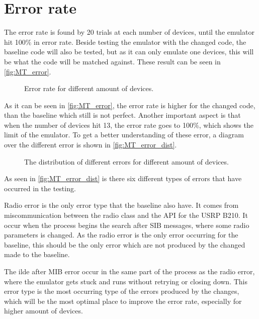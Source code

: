 \section{Error rate}
The error rate is found by 20 trials at each number of devices, until the emulator hit 100\% in error rate. Beside testing the emulator with the changed code, the baseline code will also be tested, but as it can only emulate one devices, this will be what the code will be matched against. These result can be seen in \autoref{fig:MT_error}.

\begin{figure}[H]
\centering
\resizebox{0.5\textwidth}{!}{
}
\caption{Error rate for different amount of devices.}
\label{fig:MT_error}
\end{figure}

As it can be seen in \autoref{fig:MT_error}, the error rate is higher for the changed code, than the baseline which still is not perfect. Another important aspect is that when the number of devices hit 13, the error rate goes to 100\%, which shows the limit of the emulator. To get a better understanding of these error, a diagram over the different error is shown in \autoref{fig:MT_error_dist}.

\begin{figure}[H]
\centering
\resizebox{0.8\textwidth}{!}{
}
\caption{The distribution of different errors for different amount of devices.}
\label{fig:MT_error_dist}
\end{figure}

As seen in \autoref{fig:MT_error_dist} is there six different types of errors that have occurred in the testing.

Radio error is the only error type that the baseline also have. It comes from miscommunication between the radio class and the API for the USRP B210. It occur when the process begins the search after SIB messages, where some radio parameters is changed. As the radio error is the only error occurring for the baseline, this should be the only error which are not produced by the changed made to the baseline.

The ilde after MIB error occur in the same part of the process as the radio error, where the emulator gets stuck and runs without retrying or closing down. This error type is the most occurring type of the errors produced by the changes, which will be the most optimal place to improve the error rate, especially for higher amount of devices.

